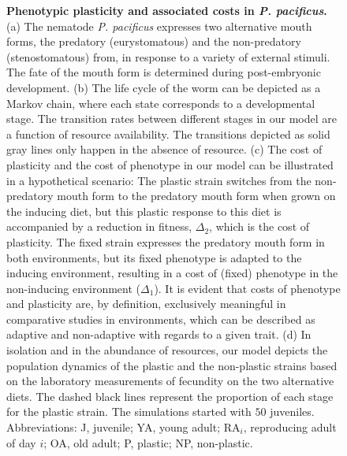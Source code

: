 \documentclass[10pt,letterpaper]{article}
\newcommand{\ppac}{\emph{P. pacificus}}
\begin{document}
\begin{figure}
\begin{adjustwidth}{-2in}{0in}
\begin{flushright}
\caption{\textbf{Phenotypic plasticity and associated costs in \ppac{}.} \footnotesize (a) The nematode \ppac{} expresses two alternative mouth forms, the predatory (eurystomatous) and the non-predatory (stenostomatous) from, in response to a variety of external stimuli. The fate of the mouth form is determined during post-embryonic development. (b) The life cycle of the worm can be depicted as a Markov chain, where each state corresponds to a developmental stage. The transition rates between different stages in our model are a function of resource availability. The transitions depicted as solid gray lines only happen in the absence of resource. (c) The cost of plasticity and the cost of phenotype in our model can be illustrated in a hypothetical scenario: The plastic strain  switches from the non-predatory mouth form to the predatory mouth form when grown on the inducing diet, but this plastic response to this diet is accompanied by a reduction in fitness, $\Delta_2$, which is the cost of plasticity. The fixed strain expresses the predatory mouth form in both environments, but its fixed phenotype is adapted to the inducing environment, resulting in a cost of (fixed) phenotype in the non-inducing environment ($\Delta_1$). It is evident that costs of phenotype and plasticity are, by definition, exclusively meaningful in comparative studies in environments, which can be described as adaptive and non-adaptive with regards to a given trait. (d) In isolation and in the abundance of resources, our model depicts the population dynamics of the plastic and the non-plastic strains based on the laboratory measurements of fecundity on the two alternative diets. The dashed black lines represent the proportion of each stage for the plastic strain. The simulations started with $50$ juveniles. Abbreviations: J, juvenile; YA, young adult; $\mathrm{RA}_i$, reproducing adult of day $i$; OA, old adult; P, plastic; NP, non-plastic.}
\label{fig:fig1}
\end{flushright}
\end{adjustwidth}
\end{figure}
\end{document}
